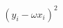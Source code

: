 \documentclass[preview]{standalone}
\begin{document}
\begin{align*}
(y_i -\omega x_i)^2
\end{align*}
\end{document}
